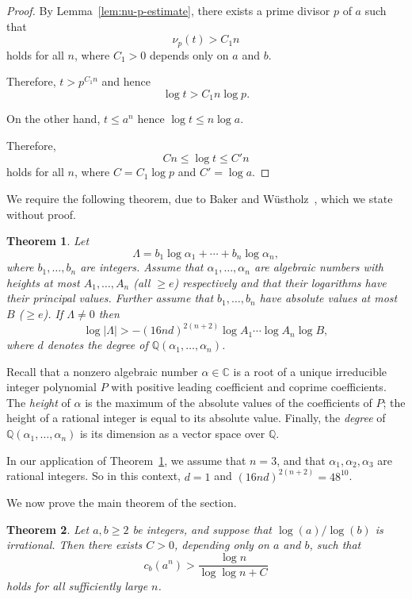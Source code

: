 \documentclass[12pt]{amsart}
\newtheorem{theorem}{Theorem}
\theoremstyle{remark}
\begin{document}
\begin{proof}
    By Lemma~\ref{lem:nu-p-estimate}, there exists a prime divisor $p$ of $a$ such that
    \[
        \nu_p(t) > C_1 n
    \]
    holds for all $n$, where $C_1 > 0$ depends only on $a$ and $b$.

    Therefore, $\displaystyle t > p^{C_1 n}$ and hence
    \[
        \log t > C_1 n \log p.
    \]

    On the other hand, $t \le a^n$ hence $\log t \le n \log a$.

    Therefore,
    \[
        Cn \le \log t \le C'n
    \]
    holds for all $n$, where $C = C_1 \log p$ and $C' = \log a$.
\end{proof}

We require the following theorem, due to Baker and Wüstholz~\cite{baker-wustholz1993},
which we state without proof.

\begin{theorem} \label{baker}
    Let
    \[
        \Lambda = b_1 \log \alpha_1 + \cdots + b_n \log \alpha_n,
    \]
    where $b_1, \ldots, b_n$ are integers. Assume that
    $\alpha_1, \ldots, \alpha_n$ are algebraic numbers with heights
    at most $A_1, \ldots, A_n$ (all $\ge e$) respectively and
    that their logarithms have their principal values.
    Further assume that $b_1, \ldots, b_n$ have absolute values
    at most $B$ ($\ge e$). If $\Lambda \ne 0$ then
    \[
        \log |\Lambda| > -(16nd)^{2(n+2)} \log A_1 \cdots \log A_n \log B,
    \]
    where $d$ denotes the degree of $\mathbb{Q}(\alpha_1, \ldots, \alpha_n)$.
\end{theorem}

Recall that a nonzero algebraic number $\alpha \in \mathbb{C}$ is a root of a unique irreducible
integer polynomial $P$ with positive leading coefficient and coprime coefficients.
The \emph{height} of $\alpha$ is the maximum of the absolute values of the coefficients of $P$;
the height of a rational integer is equal to its absolute value.
Finally, the \emph{degree} of $\mathbb{Q}(\alpha_1, \ldots, \alpha_n)$
is its dimension as a vector space over $\mathbb{Q}$.

In our application of Theorem~\ref{baker},
we assume that $n = 3$, and that $\alpha_1, \alpha_2, \alpha_3$ are rational integers.
So in this context, $d = 1$ and $(16nd)^{2(n+2)} = 48^{10}$.

We now prove the main theorem of the section.

\begin{theorem}\label{thm:digit-lower-bound}
    Let $a, b \ge 2$ be integers, and suppose that
    $\log(a)/\log(b)$ is irrational.
    Then there exists $C > 0$, depending only on $a$ and $b$,
    such that
    \[
        c_b(a^n) > \frac{\log n}{\log \log n + C}
    \]
    holds for all sufficiently large $n$.
\end{theorem}
\end{document}

